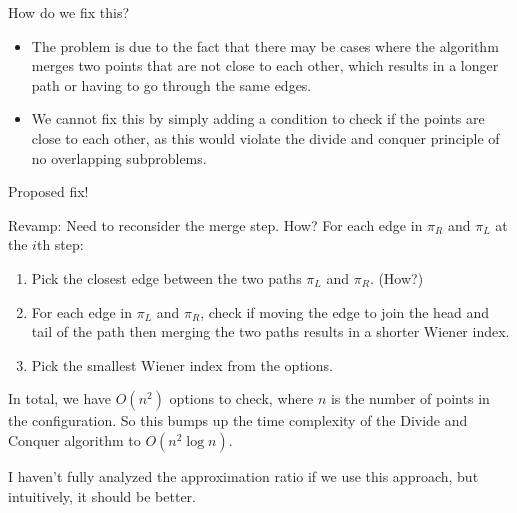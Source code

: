 \documentclass[11pt]{beamer}
\begin{document}
\begin{frame}{How do we fix this?}
	\begin{itemize}
		\item The problem is due to the fact that there may be cases where the algorithm merges two points that are not close to each other, which results in a longer path or having to go through the same edges.
		      \pause
		      \vspace{0.5cm}
		\item We cannot fix this by simply adding a condition to check if the points are close to each other, as this would violate the divide and conquer principle of no overlapping subproblems.
	\end{itemize}
\end{frame}

\begin{frame}{Proposed fix!}
	\begin{block}{Revamp: Need to reconsider the merge step. How?}
		For each edge in $\pi_R$ and $\pi_L$ at the $i$th step:
		\begin{enumerate}
			\item Pick the closest edge between the two paths $\pi_L$ and $\pi_R$. (How?)
			      \pause
			\item For each edge in $\pi_L$ and $\pi_R$, check if moving the edge to join the head and tail of the path then merging the two paths results in a shorter Wiener index.
			      \pause
			\item Pick the smallest Wiener index from the options.
		\end{enumerate}
	\end{block}
	\pause
	In total, we have $O(n^2)$ options to check, where $n$ is the number of points in the configuration. So this bumps up the time complexity of the Divide and Conquer algorithm to $O(n^2 \log n)$.

	\pause
	I haven't fully analyzed the approximation ratio if we use this approach, but intuitively, it should be better.
\end{frame}
\end{document}
